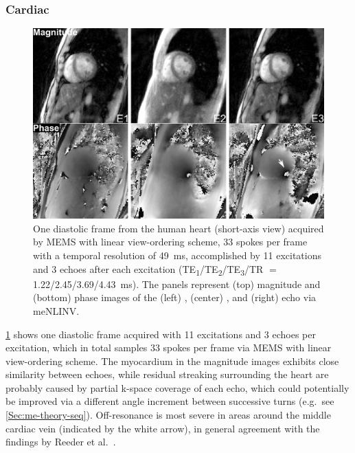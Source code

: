 \subsubsection*{Cardiac}
\begin{figure}[tb]
  \centering
  \includegraphics[width=\textwidth]{fig/multi-echo-cardiac-menlinv.png}
  \caption{One diastolic frame from the human heart (short-axis view) acquired by MEMS with linear view-ordering scheme, \num{33} spokes per frame with a temporal resolution of \SI{49}{\ms}, accomplished by \num{11} excitations and \num{3} echoes after each excitation (TE\textsubscript{\num{1}}/TE\textsubscript{\num{2}}/TE\textsubscript{\num{3}}/TR $=$ \num{1.22}/\num{2.45}/\num{3.69}/\SI{4.43}{\ms}). The panels represent (top) magnitude and (bottom) phase images of the (left) , (center) , and (right)  echo via meNLINV.} \label{Fig:multi-echo-cardiac-menlinv}
\end{figure}
\cref{Fig:multi-echo-cardiac-menlinv} shows one diastolic frame acquired with \num{11} excitations and \num{3} echoes per excitation, which in total samples \num{33} spokes per frame via MEMS with linear view-ordering scheme. The myocardium in the magnitude images exhibits close similarity between echoes, while residual streaking surrounding the heart are probably caused by partial k-space coverage of each echo, which could potentially be improved via a different angle increment between successive turns (e.g.~see \cref{Sec:me-theory-seq}). Off-resonance is most severe in areas around the middle cardiac vein (indicated by the white arrow), in general agreement with the findings by Reeder et al.~\cite{1998_R2s_fim_heart}.

